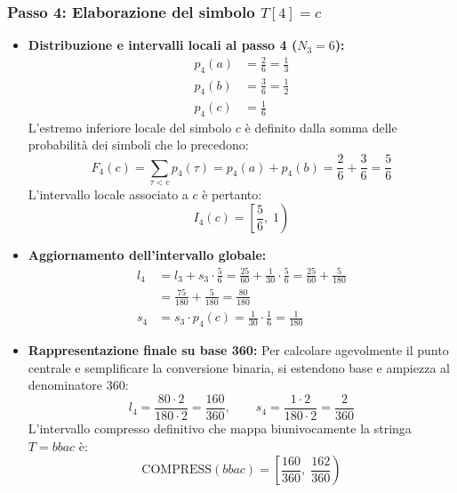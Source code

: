 \subsubsection*{Passo 4: Elaborazione del simbolo $T[4] = c$}
\begin{itemize}
  \item \textbf{Distribuzione e intervalli locali al passo 4 ($N_3 = 6$):}
  \begin{align}
    p_4(a) &= \frac{2}{6} = \frac{1}{3} \\
    p_4(b) &= \frac{3}{6} = \frac{1}{2} \\
    p_4(c) &= \frac{1}{6}
  \end{align}
  L'estremo inferiore locale del simbolo $c$ \`e definito dalla somma delle probabilit\`a dei simboli che lo precedono:
  \begin{equation}
    F_4(c) = \sum_{\tau < c} p_4(\tau) = p_4(a) + p_4(b) = \frac{2}{6} + \frac{3}{6} = \frac{5}{6}
  \end{equation}
  L'intervallo locale associato a $c$ \`e pertanto:
  \begin{equation}
    I_4(c) = \left[ \frac{5}{6}, \; 1 \right)
  \end{equation}
  \item \textbf{Aggiornamento dell'intervallo globale:}
  \begin{align}
    l_4 &= l_3 + s_3 \cdot \frac{5}{6} = \frac{25}{60} + \frac{1}{30} \cdot \frac{5}{6} = \frac{25}{60} + \frac{5}{180} \nonumber \\
        &= \frac{75}{180} + \frac{5}{180} = \frac{80}{180} \\
    s_4 &= s_3 \cdot p_4(c) = \frac{1}{30} \cdot \frac{1}{6} = \frac{1}{180}
  \end{align}
  \item \textbf{Rappresentazione finale su base 360:}
  Per calcolare agevolmente il punto centrale e semplificare la conversione binaria, si estendono base e ampiezza al denominatore $360$:
  \begin{equation}
    l_4 = \frac{80 \cdot 2}{180 \cdot 2} = \frac{160}{360}, \qquad s_4 = \frac{1 \cdot 2}{180 \cdot 2} = \frac{2}{360}
  \end{equation}
  L'intervallo compresso definitivo che mappa biunivocamente la stringa $T = bbac$ \`e:
  \begin{equation}
    \text{COMPRESS}(bbac) = \left[ \frac{160}{360}, \; \frac{162}{360} \right)
  \end{equation}
\end{itemize}

